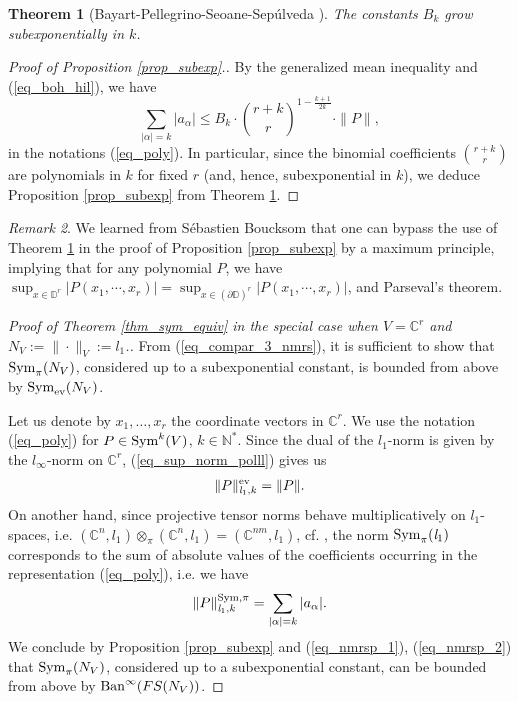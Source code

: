 \documentclass[12pt]{article}
\numberwithin{equation}{section}
\theoremstyle{theorem}
\newtheorem{thm}{Theorem}[section]
\theoremstyle{definition}
\theoremstyle{remark}
\newtheorem{rem}[thm]{Remark}
\newcommand{\sym}{{\rm{Sym}}}
\newcommand{\comp}{\mathbb{C}}
\newcommand{\nat}{\mathbb{N}}
\begin{document}
	\begin{thm}[{Bayart-Pellegrino-Seoane-Sep{\'u}lveda \cite[Corollary 5.3]{BohrRad} }]\label{thm_boh_hil_subx}
		The constants $B_k$ grow subexponentially in $k$. 
	\end{thm}
	\begin{proof}[Proof of Proposition \ref{prop_subexp}.]
		By the generalized mean inequality and (\ref{eq_boh_hil}), we have
		\begin{equation}
			\sum_{|\alpha| = k} |a_{\alpha}|
			\leq
			B_k
			\cdot
			\binom{r + k}{r}^{1 - \frac{k + 1}{2k}}
			\cdot
			\| P \|,
		\end{equation}
		in the notations (\ref{eq_poly}).
		In particular, since the binomial coefficients $\binom{r + k}{r}$ are polynomials in $k$ for fixed $r$ (and, hence, subexponential in $k$), we deduce Proposition \ref{prop_subexp} from Theorem \ref{thm_boh_hil_subx}.
	\end{proof}
	\begin{rem}
		We learned from Sébastien Boucksom that one can bypass the use of Theorem \ref{thm_boh_hil_subx} in the proof of Proposition \ref{prop_subexp} by a maximum principle, implying that for any polynomial $P$, we have $\sup_{x \in \mathbb{D}^r} | P(x_1, \cdots, x_r) |
		=
		\sup_{x \in (\partial \mathbb{D})^r} | P(x_1, \cdots, x_r) |$,
		and Parseval's theorem.
	\end{rem}
	\begin{sloppypar}
	\begin{proof}[Proof of Theorem \ref{thm_sym_equiv} in the special case when $V = \comp^r$ and $N_V := \| \cdot \|_V := \textit{l}_1$.]
		From (\ref{eq_compar_3_nmrs}), it is sufficient to show that $\sym_{\pi}(N_V)$, considered up to a subexponential constant, is bounded from above by $\sym_{{\rm{ev}}}(N_V)$.
		\par 
		Let us denote by $x_1, \ldots, x_r$ the coordinate vectors in $\comp^r$.
		We use the notation (\ref{eq_poly}) for $P \in \sym^k(V)$, $k \in \nat^*$.
		Since the dual of the $\textit{l}_1$-norm is given by the $\textit{l}_{\infty}$-norm on $\comp^r$, (\ref{eq_sup_norm_polll}) gives us 
		\begin{equation}\label{eq_nmrsp_1}
			\| P \|^{{\rm{ev}}}_{\textit{l}_1, k}
			=
			\| P \|.
		\end{equation}
		On another hand, since projective tensor norms behave multiplicatively on $\textit{l}_1$-spaces, i.e. $(\comp^n, \textit{l}_1) \otimes_{\pi} (\comp^n, \textit{l}_1) = (\comp^{nm}, \textit{l}_1)$, cf. \cite[Exercise 2.8]{RyanTensProd}, the norm $\sym_{\pi}(\textit{l}_1)$ corresponds to the sum of absolute values of the coefficients occurring in the representation (\ref{eq_poly}), i.e. we have 
		\begin{equation}\label{eq_nmrsp_2}
			\| P \|^{\sym, \pi}_{\textit{l}_1, k}
			=
			\sum_{|\alpha| = k} |a_{\alpha}|.
		\end{equation}
		We conclude by Proposition \ref{prop_subexp} and (\ref{eq_nmrsp_1}), (\ref{eq_nmrsp_2}) that $\sym_{\pi}(N_V)$, considered up to a subexponential constant, can be bounded from above by ${\rm{Ban}}^{\infty}(FS(N_V))$.
	\end{proof}
	\end{sloppypar}
		 
\end{document}
